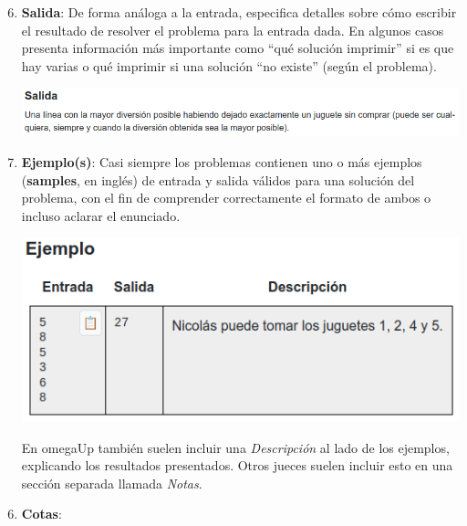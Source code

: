 \documentclass{beamer}
\begin{document}
    \begin{frame}[noframenumbering]
        \begin{enumerate}
            \setcounter{enumi}{5}
            \item \textbf{Salida}: \pause De forma análoga a la entrada, especifica detalles sobre cómo escribir el resultado de resolver el problema para la entrada dada. En algunos casos presenta información más importante como ``qué solución imprimir'' si es que hay varias o qué imprimir si una solución ``no existe'' (según el problema). \pause

            \begin{center}
                \includegraphics[width=.7\linewidth]{./ou_output.png}
            \end{center}\pause

        \item \textbf{Ejemplo(s)}: \pause Casi siempre los problemas contienen uno o más ejemplos (\textbf{samples}, en inglés) de entrada y salida válidos para una solución del problema, con el fin de comprender correctamente el formato de ambos o incluso aclarar el enunciado. \pause

            \begin{center}
                \includegraphics[width=.4\linewidth]{./ou_sample.png}
            \end{center}\pause

            En omegaUp también suelen incluir una \textit{Descripción} al lado de los ejemplos, explicando los resultados presentados. Otros jueces suelen incluir esto en una sección separada llamada \textit{Notas}. 
        \end{enumerate}
    \end{frame}

    \begin{frame}[noframenumbering]
        \begin{enumerate}
            \setcounter{enumi}{5}
            \item \textbf{Cotas}: \pause
        \end{enumerate}
    \end{frame}
\end{document}
